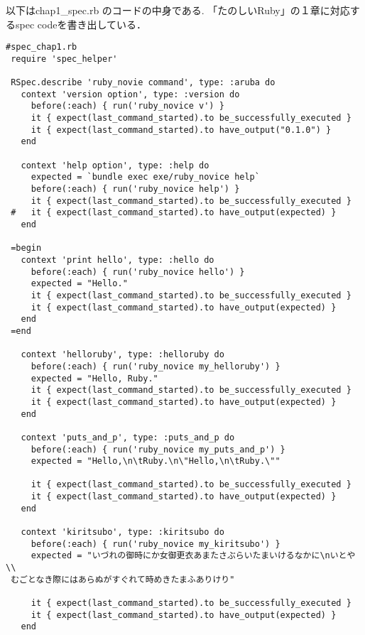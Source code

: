 以下はchap1\_spec.rb のコードの中身である. 
「たのしいRuby」の１章に対応するspec codeを書き出している．
\begin{lstlisting}[style=customRuby,basicstyle={\scriptsize\ttfamily}]
 #spec_chap1.rb
 require 'spec_helper'
 
 RSpec.describe 'ruby_novie command', type: :aruba do
   context 'version option', type: :version do
     before(:each) { run('ruby_novice v') }
     it { expect(last_command_started).to be_successfully_executed }
     it { expect(last_command_started).to have_output("0.1.0") }
   end
 
   context 'help option', type: :help do
     expected = `bundle exec exe/ruby_novice help`
     before(:each) { run('ruby_novice help') }
     it { expect(last_command_started).to be_successfully_executed }
 #   it { expect(last_command_started).to have_output(expected) }               
   end
 
 =begin                                                                          
   context 'print hello', type: :hello do                                        
     before(:each) { run('ruby_novice hello') }                                  
     expected = "Hello."                                                         
     it { expect(last_command_started).to be_successfully_executed }             
     it { expect(last_command_started).to have_output(expected) }    
   end                                                                           
 =end 
 
   context 'helloruby', type: :helloruby do
     before(:each) { run('ruby_novice my_helloruby') }
     expected = "Hello, Ruby."
     it { expect(last_command_started).to be_successfully_executed }
     it { expect(last_command_started).to have_output(expected) }
   end
 
   context 'puts_and_p', type: :puts_and_p do
     before(:each) { run('ruby_novice my_puts_and_p') }
     expected = "Hello,\n\tRuby.\n\"Hello,\n\tRuby.\""
 
     it { expect(last_command_started).to be_successfully_executed }
     it { expect(last_command_started).to have_output(expected) }
   end
 
   context 'kiritsubo', type: :kiritsubo do
     before(:each) { run('ruby_novice my_kiritsubo') }
     expected = "いづれの御時にか女御更衣あまたさぶらいたまいけるなかに\nいとや\\
 むごとなき際にはあらぬがすぐれて時めきたまふありけり"
 
     it { expect(last_command_started).to be_successfully_executed }
     it { expect(last_command_started).to have_output(expected) }
   end
 

\end{lstlisting}
